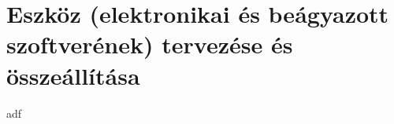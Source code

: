 \documentclass[../main.tex]{subfiles}
\begin{document}
\section{Eszköz (elektronikai és beágyazott szoftverének) tervezése és összeállítása}
adf
\end{document}
